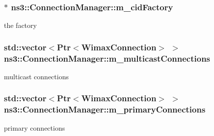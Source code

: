 \subsubsection[{\texorpdfstring{m\+\_\+cid\+Factory}{m_cidFactory}}]{$\ast$ ns3\+::\+Connection\+Manager\+::m\+\_\+cid\+Factory\hspace{0.3cm}{\ttfamily [private]}}\hypertarget{classns3_1_1ConnectionManager_afe6ce81283bd4b9cba3545fd8f799c2b}{}\label{classns3_1_1ConnectionManager_afe6ce81283bd4b9cba3545fd8f799c2b}


the factory 

\subsubsection[{\texorpdfstring{m\+\_\+multicast\+Connections}{m_multicastConnections}}]{\setlength{\rightskip}{0pt plus 5cm}std\+::vector$<${\bf Ptr}$<${\bf Wimax\+Connection}$>$ $>$ ns3\+::\+Connection\+Manager\+::m\+\_\+multicast\+Connections\hspace{0.3cm}{\ttfamily [private]}}\hypertarget{classns3_1_1ConnectionManager_aff5360d9edcfe9f6c5d1d04d2e2675f1}{}\label{classns3_1_1ConnectionManager_aff5360d9edcfe9f6c5d1d04d2e2675f1}


multicast connections 

\subsubsection[{\texorpdfstring{m\+\_\+primary\+Connections}{m_primaryConnections}}]{\setlength{\rightskip}{0pt plus 5cm}std\+::vector$<${\bf Ptr}$<${\bf Wimax\+Connection}$>$ $>$ ns3\+::\+Connection\+Manager\+::m\+\_\+primary\+Connections\hspace{0.3cm}{\ttfamily [private]}}\hypertarget{classns3_1_1ConnectionManager_a0cb92894d44165904581b248f7da763c}{}\label{classns3_1_1ConnectionManager_a0cb92894d44165904581b248f7da763c}


primary connections 

